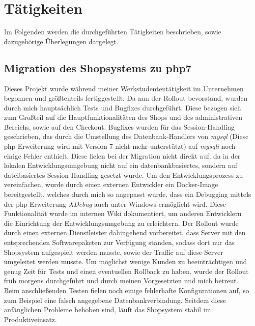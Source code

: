 \chapter{Tätigkeiten}\label{ch:taetigkeiten}
Im Folgenden werden die durchgeführten Tätigkeiten beschrieben, sowie dazugehörige Überlegungen dargelegt.



\section{Migration des Shopsystems zu php7}
Dieses Projekt wurde während meiner Werkstudententätigkeit im Unternehmen begonnen und größtenteils fertiggestellt. 
Da nun der Rollout bevorstand, wurden durch mich hauptsächlich Tests und Bugfixes durchgeführt. 
Diese bezogen sich zum Großteil auf die Hauptfunktionalitäten des Shops und des administrativen Bereichs, sowie auf den Checkout. 
Bugfixes wurden für das Session-Handling geschrieben, das durch die Umstellung des Datenbank-Handlers von \textit{mysql} 
(Diese php-Erweiterung wird mit Version 7 nicht mehr unterstützt) auf \textit{mysqli} noch einige Fehler enthielt. 
Diese fielen bei der Migration nicht direkt auf, da in der lokalen Entwicklungsumgebung nicht auf ein datenbankbasiertes, sondern auf dateibasiertes 
Session-Handling gesetzt wurde. Um den Entwicklungsprozess zu vereinfachen, wurde durch einen externen Entwickler ein Docker-Image bereitgestellt, 
welches durch mich so angepasst wurde, dass ein Debugging mittels der php-Erweiterung \textit{XDebug} auch unter Windows ermöglicht wird. 
Diese Funktionalität wurde im internen Wiki dokumentiert, um anderen Entwicklern die Einrichtung der Entwicklungsumgebung zu erleichtern.
Der Rollout wurde durch einen externen Dienstleister dahingehend vorbereitet, dass Server mit den entsprechenden Softwarepaketen zur Verfügung standen, sodass 
dort nur das Shopsystem aufgespielt werden musste, sowie der Traffic auf diese Server umgeleitet werden musste.
Um möglichst wenige Kunden zu beeinträchtigen und genug Zeit für Tests und einen eventuellen Rollback zu haben, wurde der Rollout früh morgens durchgeführt
und durch meinen Vorgesetzten und mich betreut. Beim anschließenden Testen fielen noch einige fehlerhafte Konfigurationen auf, so zum Beispiel eine 
falsch angegebene Datenbankverbindung. Seitdem diese anfänglichen Probleme behoben sind, läuft das Shopsystem stabil im Produktiveinsatz.



